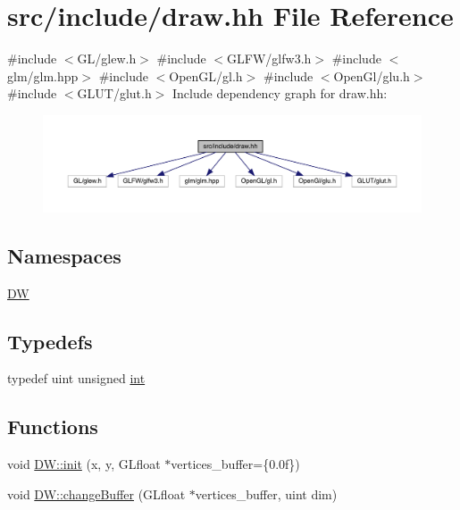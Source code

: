 \hypertarget{draw_8hh}{}\section{src/include/draw.hh File Reference}
\label{draw_8hh}
{\ttfamily \#include $<$G\+L/glew.\+h$>$}\newline
{\ttfamily \#include $<$G\+L\+F\+W/glfw3.\+h$>$}\newline
{\ttfamily \#include $<$glm/glm.\+hpp$>$}\newline
{\ttfamily \#include $<$Open\+G\+L/gl.\+h$>$}\newline
{\ttfamily \#include $<$Open\+Gl/glu.\+h$>$}\newline
{\ttfamily \#include $<$G\+L\+U\+T/glut.\+h$>$}\newline
Include dependency graph for draw.\+hh\+:
\nopagebreak
\begin{figure}[H]
\begin{center}
\leavevmode
\includegraphics[width=350pt]{draw_8hh__incl}
\end{center}
\end{figure}
\subsection*{Namespaces}
\begin{DoxyCompactItemize}
\item 
 \mbox{\hyperlink{namespace_d_w}{DW}}
\end{DoxyCompactItemize}
\subsection*{Typedefs}
\begin{DoxyCompactItemize}
\item 
typedef uint unsigned \mbox{\hyperlink{draw_8hh_aa620a13339ac3a1177c86edc549fda9b}{int}}
\end{DoxyCompactItemize}
\subsection*{Functions}
\begin{DoxyCompactItemize}
\item 
void \mbox{\hyperlink{namespace_d_w_a0a4389e2521821df2a89c92314ef00ed}{D\+W\+::init}} (x, y, G\+Lfloat $\ast$vertices\+\_\+buffer=\{0.\+0f\})
\item 
void \mbox{\hyperlink{namespace_d_w_a2a8851787a6f886e3cc91143851d78f8}{D\+W\+::change\+Buffer}} (G\+Lfloat $\ast$vertices\+\_\+buffer, uint dim)
\end{DoxyCompactItemize}
